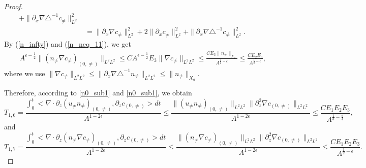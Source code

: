\documentclass[10pt,a4paper]{amsart}
\begin{document}
\begin{proof}
\begin{equation}
\begin{aligned}
				+\|\partial_x\nabla\triangle^{-1}c_{\neq}\|_{L^2}^2\\
				&=\|\partial_x\nabla c_{\neq}\|_{L^2}^2
				+2\|\partial_x c_{\neq}\|_{L^2}^2
				+\|\partial_x\nabla\triangle^{-1}c_{\neq}\|_{L^2}^2.		
			\end{aligned}
		\end{equation}
		By  (\ref{n_infty}) and (\ref{n_neq_11}), we get 
		\begin{equation}\label{n0_sub2}
			\begin{aligned}
				&\quad A^{\epsilon-\frac{1}{2}}\|(n_{\neq}\nabla c_{\neq})_{(0,\neq)}\|_{L^2L^2}
				\leq CA^{\epsilon-\frac{1}{2}}E_3
				\|\nabla c_{\neq}\|_{L^2L^2}\leq 
				\frac{CE_3\| n_{\neq}\|_{X_a}}
				{ A^{\frac12-\epsilon}}\leq\frac{CE_2E_3}{ A^{\frac12-\epsilon}},
			\end{aligned}
		\end{equation}
		where we use $\|\nabla c_{\neq}\|_{L^2L^2}\leq 
		\|\partial_x\nabla\triangle^{-1} n_{\neq}\|_{L^2L^2}
		\leq \|n_{\neq}\|_{X_a}.$
		
		Therefore, according to \eqref{n0_sub1} and \eqref{n0_sub1}, we obtain 
		\begin{equation*}
			T_{1,6}
			=\frac{\int_{0}^t<\nabla\cdot\partial_z(u_{\neq}n_{\neq})_{(0,\neq)},
				\partial_zc_{(0,\neq)}>dt}{A^{1-2\epsilon}}
			\leq \frac{\|(u_{\neq} n_{\neq})_{(0,\neq)}\|_{L^2L^2}
				\|\partial_z^2\nabla c_{(0,\neq)}\|_{L^2L^2}}{A^{1-2\epsilon}}\leq 
			\frac{CE_1E_2E_3}{ A^{\frac13-\frac{\epsilon}{4}}},
		\end{equation*}
		and 
		\begin{equation*}
			T_{1,7}
			=\frac{\int_{0}^t<\nabla\cdot\partial_z(n_{\neq}\nabla c_{\neq})_{(0,\neq)},
				\partial_zc_{(0,\neq)}>dt}{A^{1-2\epsilon}}
			\leq \frac{\|(n_{\neq}\nabla c_{\neq} )_{(0,\neq)}\|_{L^2L^2}
				\|\partial_z^2\nabla c_{(0,\neq)}\|_{L^2L^2}}{A^{1-2\epsilon}}\leq 
			\frac{CE_1E_2E_3}{ A^{\frac12-\epsilon}}.
		\end{equation*}
		

\end{proof}
\end{document}
